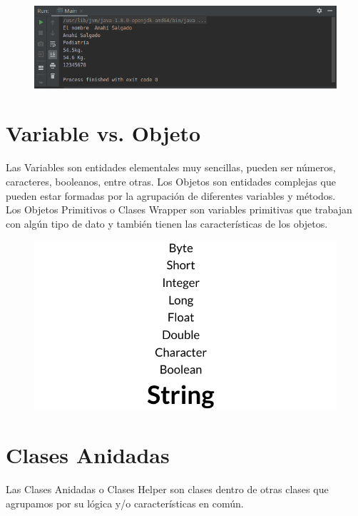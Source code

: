 \documentclass{article}
\begin{document}
\begin{figure}[h!]
  \centering
  \includegraphics[scale=0.75]{./Pictures/037_set_get.png}
\end{figure}


\section{Variable vs. Objeto}%
Las Variables son entidades elementales muy sencillas, pueden ser números,
caracteres, booleanos, entre otras. Los Objetos son entidades complejas que
pueden estar formadas por la agrupación de diferentes variables y métodos.\\

Los Objetos Primitivos o Clases Wrapper son variables primitivas que trabajan
con algún tipo de dato y también tienen las características de los objetos.\\

\begin{figure}[h!]
  \centering
  \includegraphics[scale=0.5]{./Pictures/038_class_wrapper.png}
\end{figure}


\section{Clases Anidadas}%
Las Clases Anidadas o Clases Helper son clases dentro de otras clases que
agrupamos por su lógica y/o características en común.\\
\end{document}
